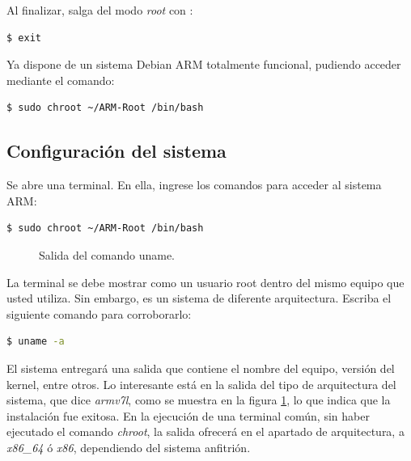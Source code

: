 Al finalizar, salga del modo \textit{root} con :

\begin{lstlisting}[language=bash]
$ exit
\end{lstlisting}

Ya dispone de un sistema Debian ARM totalmente funcional, pudiendo acceder mediante el comando:

\begin{lstlisting}[language=bash]
$ sudo chroot ~/ARM-Root /bin/bash
\end{lstlisting}

\subsection{Configuración del sistema}\label{subsec:_conf}

Se abre una terminal. En ella, ingrese los comandos para acceder al sistema ARM:

\begin{lstlisting}[language=bash]
$ sudo chroot ~/ARM-Root /bin/bash
\end{lstlisting}

\begin{figure}[H] %
\caption{Salida del comando uname.}
\label{fig:unameout}
\end{figure}

La terminal se debe mostrar como un usuario root dentro del mismo equipo que usted utiliza. Sin embargo, es un sistema de diferente arquitectura. Escriba el siguiente comando para corroborarlo:

\begin{lstlisting}[language=bash]
$ uname -a
\end{lstlisting}

El sistema entregará una salida que contiene el nombre del equipo, versión del kernel, entre otros. Lo interesante está en la salida del tipo de arquitectura del sistema, que dice \textit{armv7l}, como se muestra en la figura \ref{fig:unameout}, lo que indica que la instalación fue exitosa. En la ejecución de una terminal común, sin haber ejecutado el comando \textit{chroot}, la salida ofrecerá en el apartado de arquitectura, a \textit{x86\_64} ó \textit{x86}, dependiendo del sistema anfitrión.

